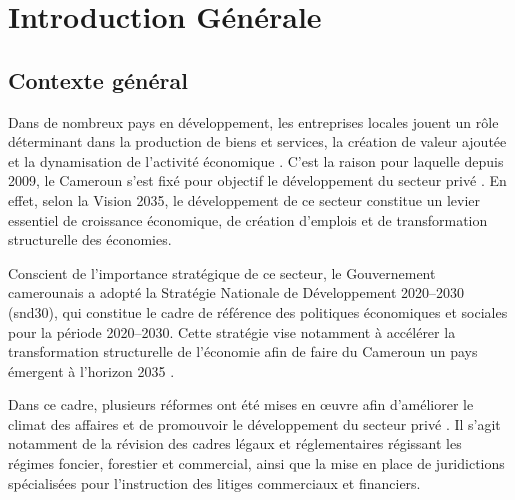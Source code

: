 \documentclass[12pt, a4paper, oneside]{report}
\begin{document}
\printglossary[type=\acronymtype, title=Liste des acronymes et abréviations]

\setcounter{page}{1}

\chapter*{Introduction Générale}

\section*{Contexte général}

Dans de nombreux pays en développement, les entreprises locales jouent un rôle déterminant dans la production de biens et services, la création de valeur ajoutée et la dynamisation de l'activité économique \cite{fmi2023}. C'est la raison pour laquelle depuis 2009, le Cameroun s'est fixé pour objectif le développement du secteur privé \cite{minepat2009}. En effet, selon la Vision 2035, le développement de ce secteur constitue un levier essentiel de croissance économique, de création d'emplois et de transformation structurelle des économies.

Conscient de l'importance stratégique de ce secteur, le Gouvernement camerounais a adopté la Stratégie Nationale de Développement 2020--2030 (\gls{snd30}), qui constitue le cadre de référence des politiques économiques et sociales pour la période 2020--2030. Cette stratégie vise notamment à accélérer la transformation structurelle de l'économie afin de faire du Cameroun un pays émergent à l'horizon 2035 \cite{minepat2020}.

Dans ce cadre, plusieurs réformes ont été mises en œuvre afin d'améliorer le climat des affaires et de promouvoir le développement du secteur privé \cite{minepat2025}. Il s'agit notamment de la révision des cadres légaux et réglementaires régissant les régimes foncier, forestier et commercial, ainsi que la mise en place de juridictions spécialisées pour l'instruction des litiges commerciaux et financiers.
\end{document}
